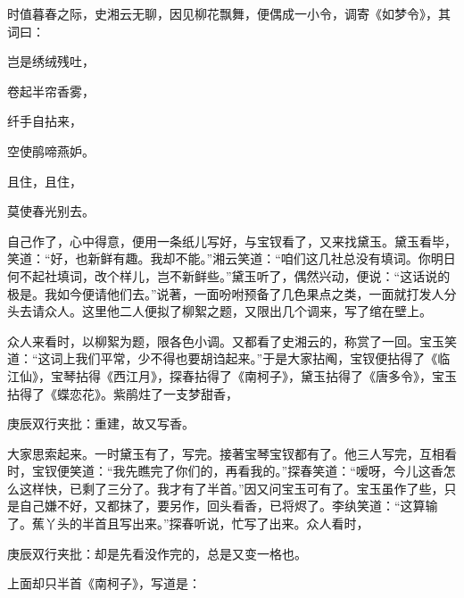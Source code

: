 \begin{parag}
    时值暮春之际，史湘云无聊，因见柳花飘舞，便偶成一小令，调寄《如梦令》，其词曰：
\end{parag}
\begin{poem}

    \begin{pl}

        岂是绣绒残吐，
    \end{pl}
    \begin{pl}

        卷起半帘香雾，
    \end{pl}
    \begin{pl}

        纤手自拈来，
    \end{pl}
    \begin{pl}

        空使鹃啼燕妒。
    \end{pl}
    \begin{pl}

        且住，且住，
    \end{pl}
    \begin{pl}

        莫使春光别去。
    \end{pl}

\end{poem}


\begin{parag}
    自己作了，心中得意，便用一条纸儿写好，与宝钗看了，又来找黛玉。黛玉看毕，笑道：“好，也新鲜有趣。我却不能。”湘云笑道：“咱们这几社总没有填词。你明日何不起社填词，改个样儿，岂不新鲜些。”黛玉听了，偶然兴动，便说：“这话说的极是。我如今便请他们去。”说著，一面吩咐预备了几色果点之类，一面就打发人分头去请众人。这里他二人便拟了柳絮之题，又限出几个调来，写了绾在壁上。
\end{parag}


\begin{parag}
    众人来看时，以柳絮为题，限各色小调。又都看了史湘云的，称赏了一回。宝玉笑道：“这词上我们平常，少不得也要胡诌起来。”于是大家拈阄，宝钗便拈得了《临江仙》，宝琴拈得《西江月》，探春拈得了《南柯子》，黛玉拈得了《唐多令》，宝玉拈得了《蝶恋花》。紫鹃炷了一支梦甜香，\begin{note}庚辰双行夹批：重建，故又写香。\end{note}大家思索起来。一时黛玉有了，写完。接著宝琴宝钗都有了。他三人写完，互相看时，宝钗便笑道：“我先瞧完了你们的，再看我的。”探春笑道：“嗳呀，今儿这香怎么这样快，已剩了三分了。我才有了半首。”因又问宝玉可有了。宝玉虽作了些，只是自己嫌不好，又都抹了，要另作，回头看香，已将烬了。李纨笑道：“这算输了。蕉丫头的半首且写出来。”探春听说，忙写了出来。众人看时，\begin{note}庚辰双行夹批：却是先看没作完的，总是又变一格也。\end{note}上面却只半首《南柯子》，写道是：
\end{parag}


